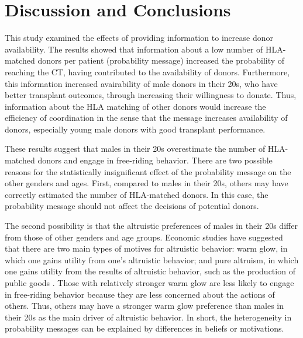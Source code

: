 \documentclass[12pt, a4paper]{article}
\begin{document}
\hypertarget{conclusion}{%
\section{Discussion and Conclusions}\label{conclusion}}

This study examined the effects of providing information to increase donor availability. The results showed that information about a low number of HLA-matched donors per patient (probability message) increased the probability of reaching the CT, having contributed to the availability of donors. Furthermore, this information increased avairability of male donors in their 20s, who have better transplant outcomes, through increasing their willingness to donate. Thus, information about the HLA matching of other donors would increase the efficiency of coordination in the sense that the message increases availability of donors, especially young male donors with good transplant performance.

These results suggest that males in their 20s overestimate the number of HLA-matched donors and engage in free-riding behavior. There are two possible reasons for the statistically insignificant effect of the probability message on the other genders and ages. First, compared to males in their 20s, others may have correctly estimated the number of HLA-matched donors. In this case, the probability message should not affect the decisions of potential donors.

The second possibility is that the altruistic preferences of males in their 20s differ from those of other genders and age groups. Economic studies have suggested that there are two main types of motives for altruistic behavior: warm glow, in which one gains utility from one's altruistic behavior; and pure altruism, in which one gains utility from the results of altruistic behavior, such as the production of public goods \citep[e.g.,][]{Andreoni1990}. Those with relatively stronger warm glow are less likely to engage in free-riding behavior because they are less concerned about the actions of others. Thus, others may have a stronger warm glow preference than males in their 20s as the main driver of altruistic behavior. In short, the heterogeneity in probability messages can be explained by differences in beliefs or motivations.
\end{document}
